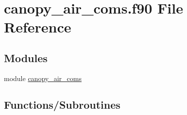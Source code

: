 \hypertarget{canopy__air__coms_8f90}{}\section{canopy\+\_\+air\+\_\+coms.\+f90 File Reference}
\label{canopy__air__coms_8f90}
\subsection*{Modules}
\begin{DoxyCompactItemize}
\item 
module \hyperlink{namespacecanopy__air__coms}{canopy\+\_\+air\+\_\+coms}
\end{DoxyCompactItemize}
\subsection*{Functions/\+Subroutines}
